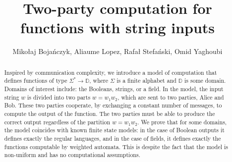 \documentclass[11pt]{article}
\newcommand{\domain}{\mathbb D}
\begin{document}
\title{Two-party computation for functions with string inputs}
\author{Miko{\l}aj Boja\'nczyk, Aliaume Lopez, Rafa{\l} Stefa\'nski, Omid Yaghoubi }

\maketitle 
\begin{abstract}
 Inspired by communication complexity, we introduce a model of computation that defines functions of type $\Sigma^* \to \domain$, where $\Sigma$ is a finite alphabet and $\domain$ is some domain. Domains of interest include: the Booleans, strings, or a field. In the model, the input string $w$ is divided into two parts $w=w_1 w_2$, which are sent to two parties, Alice and Bob. These two parties cooperate, by exchanging a constant number of messages, to compute the output of the function. The two parties must be able to produce the correct output regardless of the partition $w = w_1 w_2$. We prove that for some domains, the model coincides with known finite state models: in the case of Boolean outputs it defines exactly the regular languages, and in the case of fields, it defines exactly the functions computable by weighted automata. This is despite the fact that the model is non-uniform and has no computational assumptions. 
\end{abstract}















\end{document}
